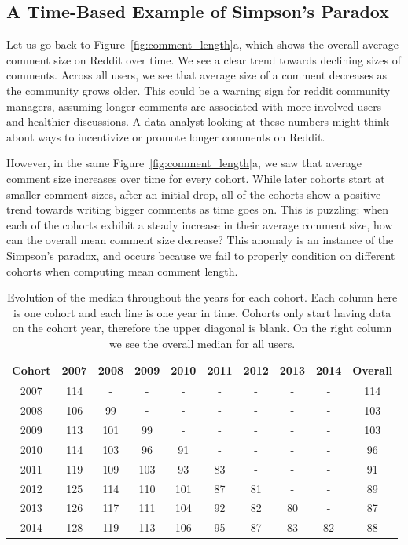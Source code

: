 \subsection{A Time-Based Example of Simpson's Paradox}

Let us go back to Figure~\ref{fig:comment_length}a, which shows the overall average comment size on Reddit over time. We see a clear trend towards declining sizes of comments.  Across all users, we see that average size of a comment decreases as the community grows older. This could be a warning sign for reddit community managers, assuming longer comments are associated with more involved users and healthier discussions. A data analyst looking at these numbers might think about ways to incentivize or promote longer comments on Reddit. 

However, in the same Figure~\ref{fig:comment_length}a, we saw that average comment size increases over time for every cohort. While later cohorts start at smaller comment sizes, after an initial drop, all of the cohorts show a positive trend towards writing bigger comments as time goes on.  This is puzzling: when each of the cohorts exhibit a steady increase in their average comment size, how can the overall mean comment size decrease?  This anomaly is an instance of the Simpson's paradox, and occurs because we fail to properly condition on different cohorts when computing mean comment length. 

\begin{table}[!tb]
\centering
\tabcolsep=0.11cm
\singlespacing
\fontsize{7pt}{8pt}\selectfont
\begin{tabular}{|c|c|c|c|c|c|c|c|c|c|}
\hline
Cohort & 2007 & 2008 & 2009 & 2010 & 2011 & 2012 & 2013 & 2014 & Overall\\ \hline
2007 & 114 & - & - & - & - & - & - & - & 114 \\ \hline
2008 & 106 & 99 & - & - & - & - & - & - & 103 \\ \hline
2009 & 113 & 101 & 99 & - & - & - & - & - & 103 \\ \hline
2010 & 114 & 103 & 96 & 91 & - & - & - & - & 96 \\ \hline
2011 & 119 & 109 & 103 & 93 & 83 & - & - & - & 91 \\ \hline
2012 & 125 & 114 & 110 & 101 & 87 & 81 & - & - & 89 \\ \hline
2013 & 126 & 117 & 111 & 104 & 92 & 82 & 80 & - & 87 \\ \hline
2014 & 128 & 119 & 113 & 106 & 95 & 87 & 83 & 82 & 88 \\ \hline
\end{tabular}
\caption{Evolution of the median throughout the years for each cohort. Each column here is one cohort and each line is one year in time. Cohorts only start having data on the cohort year, therefore the upper diagonal is blank. On the right column we see the overall median for all users.}
\label{tab:simpson}
\end{table}


